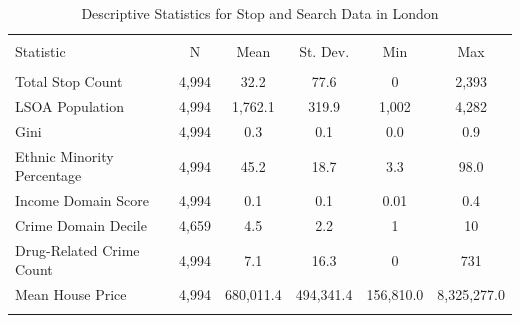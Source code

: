 
\begin{table}[!htbp] \centering 
  \caption{Descriptive Statistics for Stop and Search Data in London} 
  \label{tab:descriptive_london} 
\begin{tabular}{@{\extracolsep{5pt}}lccccc} 
\\[-1.8ex]\hline 
\hline \\[-1.8ex] 
Statistic & \multicolumn{1}{c}{N} & \multicolumn{1}{c}{Mean} & \multicolumn{1}{c}{St. Dev.} & \multicolumn{1}{c}{Min} & \multicolumn{1}{c}{Max} \\ 
\hline \\[-1.8ex] 
Total Stop Count & 4,994 & 32.2 & 77.6 & 0 & 2,393 \\ 
LSOA Population & 4,994 & 1,762.1 & 319.9 & 1,002 & 4,282 \\ 
Gini & 4,994 & 0.3 & 0.1 & 0.0 & 0.9 \\ 
Ethnic Minority Percentage & 4,994 & 45.2 & 18.7 & 3.3 & 98.0 \\ 
Income Domain Score & 4,994 & 0.1 & 0.1 & 0.01 & 0.4 \\ 
Crime Domain Decile & 4,659 & 4.5 & 2.2 & 1 & 10 \\ 
Drug-Related Crime Count & 4,994 & 7.1 & 16.3 & 0 & 731 \\ 
Mean House Price & 4,994 & 680,011.4 & 494,341.4 & 156,810.0 & 8,325,277.0 \\ 
\hline \\[-1.8ex] 
\end{tabular} 
\end{table} 

